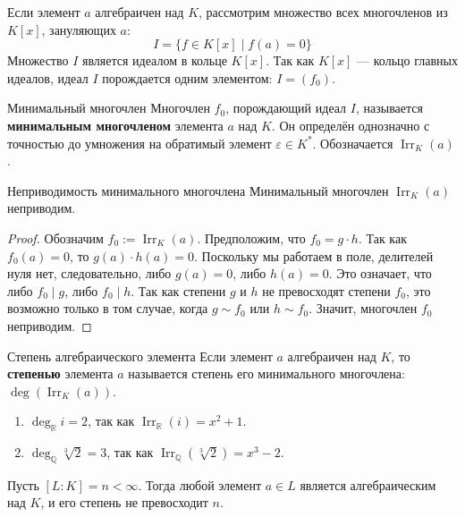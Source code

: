 Если элемент $a$ алгебраичен над $K$, рассмотрим множество всех многочленов из $K[x]$, зануляющих $a$:
\[ I = \{ f \in K[x] \mid f(a) = 0 \} \]
Множество $I$ является идеалом в кольце $K[x]$. Так как $K[x]$ --- кольцо главных идеалов, идеал $I$ порождается одним элементом: $I = (f_0)$.

\begin{Definition}{Минимальный многочлен}{}
	Многочлен $f_0$, порождающий идеал $I$, называется \textbf{минимальным многочленом} элемента $a$ над $K$.
	Он определён однозначно с точностью до умножения на обратимый элемент $\varepsilon \in K^*$. Обозначается $\operatorname{Irr}_K(a)$.
\end{Definition}

\begin{Lemma}{Неприводимость минимального многочлена}{}
	Минимальный многочлен $\operatorname{Irr}_K(a)$ неприводим.
\end{Lemma}

\begin{proof}
	Обозначим $f_0 := \operatorname{Irr}_K(a)$. Предположим, что $f_0 = g \cdot h$.
	Так как $f_0(a) = 0$, то $g(a) \cdot h(a) = 0$.
	Поскольку мы работаем в поле, делителей нуля нет, следовательно, либо $g(a) = 0$, либо $h(a) = 0$.
	Это означает, что либо $f_0 \mid g$, либо $f_0 \mid h$.
	Так как степени $g$ и $h$ не превосходят степени $f_0$, это возможно только в том случае, когда $g \sim f_0$ или $h \sim f_0$. Значит, многочлен $f_0$ неприводим.
\end{proof}

\begin{Definition}{Степень алгебраического элемента}{}
	Если элемент $a$ алгебраичен над $K$, то \textbf{степенью} элемента $a$ называется степень его минимального многочлена: $\deg(\operatorname{Irr}_K(a))$.
\end{Definition}

\begin{Example}{}{}
	\begin{enumerate}
		\item $\deg_{\mathbb{R}} i = 2$, так как $\operatorname{Irr}_{\mathbb{R}}(i) = x^2 + 1$.
		\item $\deg_{\mathbb{Q}} \sqrt[3]{2} = 3$, так как $\operatorname{Irr}_{\mathbb{Q}}(\sqrt[3]{2}) = x^3 - 2$.
	\end{enumerate}
\end{Example}

\begin{Proposition}{}{}
	Пусть $[L:K] = n < \infty$. Тогда любой элемент $a \in L$ является алгебраическим над $K$, и его степень не превосходит $n$.
\end{Proposition}


